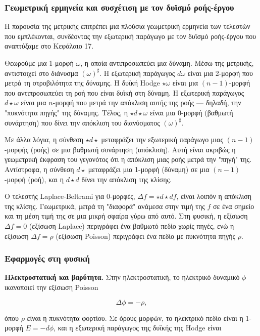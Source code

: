 \documentclass[12pt]{article}
\begin{document}
\subsubsection{Γεωμετρική ερμηνεία και συσχέτιση με τον δυϊσμό ροής-έργου}

Η παρουσία της μετρικής επιτρέπει μια πλούσια γεωμετρική ερμηνεία των τελεστών που εμπλέκονται, συνδέοντας την εξωτερική παράγωγο με τον δυϊσμό ροής-έργου που αναπτύξαμε στο Κεφάλαιο 17.

Θεωρούμε μια 1-μορφή $\omega$, η οποία αντιπροσωπεύει μια δύναμη. Μέσω της μετρικής, αντιστοιχεί στο διάνυσμα $(\omega)^\sharp$. Η εξωτερική παράγωγος $d\omega$ είναι μια 2-μορφή που μετρά τη στροβιλότητα της δύναμης. Η δυϊκή Hodge $\star \omega$ είναι μια $(n-1)$-μορφή που αντιπροσωπεύει τη ροή που είναι δυϊκή στη δύναμη. Η εξωτερική παράγωγος $d \star \omega$ είναι μια $n$-μορφή που μετρά την απόκλιση αυτής της ροής — δηλαδή, την "πυκνότητα πηγής" της δύναμης. Τέλος, η $\star d \star \omega$ είναι μια 0-μορφή (βαθμωτή συνάρτηση) που δίνει την απόκλιση του διανύσματος $(\omega)^\sharp$.

Με άλλα λόγια, η σύνθεση $\star d \star$ μεταφράζει την εξωτερική παράγωγο μιας $(n-1)$-μορφής (ροής) σε μια βαθμωτή συνάρτηση (απόκλιση). Αυτή είναι ακριβώς η γεωμετρική έκφραση του γεγονότος ότι η απόκλιση μιας ροής μετρά την "πηγή" της. Αντίστροφα, η σύνθεση $d \star$ μεταφράζει μια 1-μορφή (δύναμη) σε μια $(n-1)$-μορφή (ροή), και η $d \star d$ δίνει την απόκλιση της κλίσης.

Ο τελεστής Laplace-Beltrami για 0-μορφές, $\Delta f = \star d \star df$, είναι λοιπόν η απόκλιση της κλίσης. Γεωμετρικά, μετρά τη "διαφορά" ανάμεσα στην τιμή της $f$ σε ένα σημείο και τη μέση τιμή της σε μια μικρή σφαίρα γύρω από αυτό. Στη φυσική, η εξίσωση $\Delta f = 0$ (εξίσωση Laplace) περιγράφει ένα βαθμωτό πεδίο χωρίς πηγές, ενώ η εξίσωση $\Delta f = \rho$ (εξίσωση Poisson) περιγράφει ένα πεδίο με πυκνότητα πηγής $\rho$.

\subsubsection{Εφαρμογές στη φυσική}

\textbf{Ηλεκτροστατική και βαρύτητα.} Στην ηλεκτροστατική, το ηλεκτρικό δυναμικό $\phi$ ικανοποιεί την εξίσωση Poisson

\[
\Delta \phi = -\rho,
\]

όπου $\rho$ είναι η πυκνότητα φορτίου. Σε όρους μορφών, το ηλεκτρικό πεδίο είναι η 1-μορφή $E = -d\phi$, και η εξωτερική παράγωγος της δυϊκής της Hodge είναι
\end{document}
